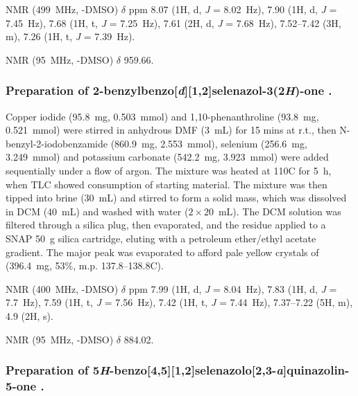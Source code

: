 \begin{refsection}
     NMR (499~MHz, -DMSO) $ \delta $ ppm 8.07 (1H, d, \textit{J} = 8.02~Hz), 7.90 (1H, d, \textit{J} = 7.45~Hz), 7.68 (1H, t, \textit{J} = 7.25~Hz), 7.61 (2H, d, \textit{J} = 7.68~Hz), 7.52--7.42 (3H, m), 7.26 (1H, t, \textit{J} = 7.39~Hz).
    
     NMR (95~MHz, -DMSO) $ \delta $ 959.66.
    
    \subsubsection[Preparation of \refcmpd{ebs.bn}.]{Preparation of 2-benzylbenzo[\textit{d}][1,2]selenazol-3(2\textit{H})-one .}
    
    Copper iodide (95.8~mg, 0.503~mmol) and 1,10-phenanthroline (93.8~mg, 0.521~mmol) were stirred in anhydrous DMF (3~mL) for 15 mins at r.t., then N-benzyl-2-iodobenz\-amide (860.9~mg, 2.553~mmol), selenium (256.6~mg, 3.249~mmol) and potassium carbonate (542.2~mg, 3.923~mmol) were added sequentially under a flow of argon.
    The mixture was heated at 110\degree{}C for 5~h, when TLC showed consumption of starting material.
    The mixture was then tipped into brine (30~mL) and stirred to form a solid mass, which was dissolved in DCM (40~mL) and washed with water ($ 2 \times 20 $~mL).
    The DCM solution was filtered through a silica plug, then evaporated, and the residue applied to a SNAP 50~g silica cartridge, eluting with a petroleum ether/ethyl acetate gradient.
    The major peak was evaporated to afford pale yellow crystals of  (396.4~mg, 53\%, m.p. 137.8--138.8\degree{}C).
    
     NMR (400~MHz, -DMSO) $\delta$ ppm 7.99 (1H, d, \textit{J} = 8.04~Hz), 7.83 (1H, d, \textit{J} = 7.7~Hz), 7.59 (1H, t, \textit{J} = 7.56~Hz), 7.42 (1H, t, \textit{J} = 7.44~Hz), 7.37--7.22 (5H, m), 4.9 (2H, s).
    
     NMR (95~MHz, -DMSO) $ \delta $ 884.02.
    
    \subsubsection[Preparation of \refcmpd{tetracycle}.]{Preparation of 5\textit{H}-benzo[4,5][1,2]selenazolo[2,3-\textit{a}]quinazolin-5-one .}
    

\end{refsection}
